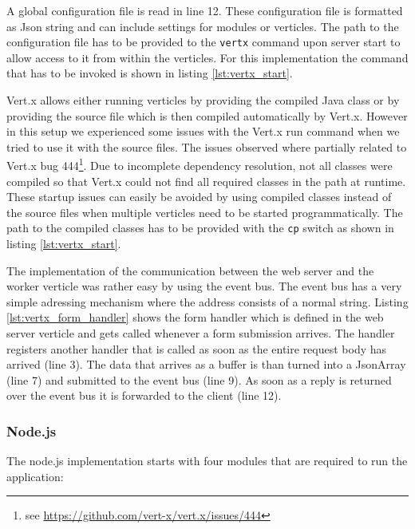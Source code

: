 A global configuration file is read in line 12. These configuration file is
formatted as Json string and can include settings for modules or verticles. The
path to the configuration file has to be provided to the \texttt{vertx} command
upon server start to allow access to it from within the verticles. For this implementation the command that
has to be invoked is shown in listing \ref{lst:vertx_start}.



Vert.x allows either running verticles by providing the compiled Java class or by providing the
source file which is then compiled automatically by Vert.x. However in this
setup we experienced some issues with the Vert.x run command when we tried to
use it with the source files. The issues observed where partially related to
Vert.x bug 444\footnote{see \url{https://github.com/vert-x/vert.x/issues/444}}.
Due to incomplete dependency resolution, not all classes were compiled so that
Vert.x could not find all required classes in the path at runtime.
These startup issues can easily be avoided by using compiled classes instead of
the source files when multiple verticles need to be started programmatically.
The path to the compiled classes has to be provided with the \texttt{cp} switch as
shown in listing \ref{lst:vertx_start}.





The implementation of the communication between the web server and the worker
verticle was rather easy by using the event bus. The event bus has a very
simple adressing mechanism where the address consists of a normal string.
Listing \ref{lst:vertx_form_handler} shows the form handler which is defined
in the web server verticle and gets called whenever a form submission arrives.
The handler registers another handler that is called as soon as the entire
request body has arrived (line 3). The data that arrives as a buffer is than
turned into a JsonArray (line 7) and submitted to the event bus (line 9).
As soon as a reply is returned over the event bus it is forwarded to the client (line 12).



\subsubsection{Node.js}
\label{implementation_node}
The node.js implementation starts with four modules that are required to run the application:


